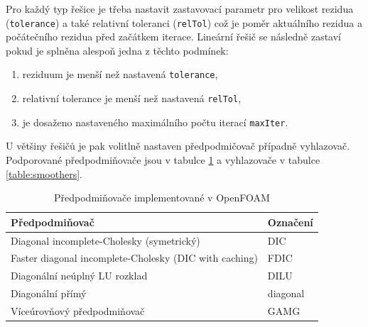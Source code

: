 \documentclass[a4paper,12pt]{report}
\theoremstyle{remark}
\begin{document}
Pro každý typ řešice je třeba nastavit zastavovací parametr pro velikost rezidua (\texttt{tolerance}) a také relativní toleranci (\texttt{relTol}) což je poměr aktuálního rezidua a počátečního rezidua před začátkem iterace. Lineární řešič se následně zastaví pokud je splněna alespoň jedna z těchto podmínek:
\begin{enumerate}
	\item reziduum je menší než nastavená \texttt{tolerance},
	\item relativní tolerance je menší než nastavená \texttt{relTol},
	\item je dosaženo nastaveného maximálního počtu iterací \texttt{maxIter}.
\end{enumerate}




U většiny řešičů je pak volitlně nastaven předpodmičovač případně vyhlazovač. Podporované předpodmiňovače jsou v tabulce \ref{table:preconditioners} a vyhlazovače v tabulce \ref{table:smoothers}.

\begin{table}[H]
	\centering
	\caption{Předpodmiňovače implementované v OpenFOAM}
	\renewcommand{\arraystretch}{1.7}
	\begin{tabular}{*2l}
		\toprule
		\textbf{Předpodmiňovač} & \textbf{Označení}\\
		\midrule
		{\small Diagonal incomplete-Cholesky (symetrický)}& DIC\\
		{\small Faster diagonal incomplete-Cholesky (DIC with caching)	}& FDIC \\		
		{\small Diagonální neúplný LU rozklad}& DILU  \\
		{\small Diagonální přímý}& diagonal \\
		{\small Víceúrovňový předpodmiňovač}& GAMG  \\
		\bottomrule
	\end{tabular}
	
	\label{table:preconditioners}
\end{table}
\end{document}
